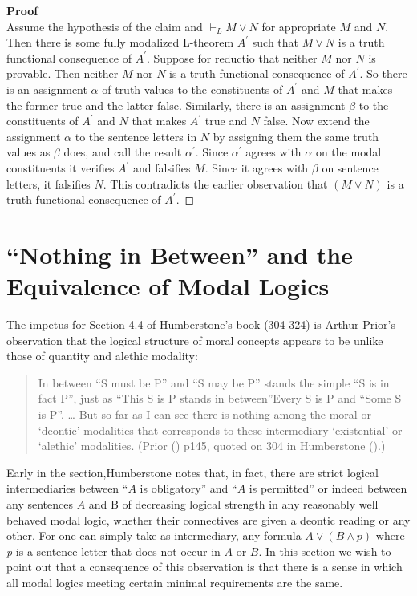 \documentclass[
  11pt,
  letterpaper,
  DIV=11,
  numbers=noendperiod,
  twoside]{scrartcl}
\begin{document}
\textbf{Proof}\\
Assume the hypothesis of the claim and \(\vdash_LM\vee N\) for
appropriate \(M\) and \(N\). Then there is some fully modalized
L-theorem \(A^\prime\) such that \(M\vee N\) is a truth functional
consequence of \(A^\prime\). Suppose for reductio that neither \(M\) nor
\(N\) is provable. Then neither \(M\) nor \(N\) is a truth functional
consequence of \(A^\prime\). So there is an assignment \(\alpha\) of
truth values to the constituents of \(A^\prime\) and \(M\) that makes
the former true and the latter false. Similarly, there is an assignment
\(\beta\) to the constituents of \(A^\prime\) and \(N\) that makes
\(A^\prime\) true and \(N\) false. Now extend the assignment \(\alpha\)
to the sentence letters in \(N\) by assigning them the same truth values
as \(\beta\) does, and call the result \(\alpha^\prime\). Since
\(\alpha^\prime\) agrees with \(\alpha\) on the modal constituents it
verifies \(A^\prime\) and falsifies \(M\). Since it agrees with
\(\beta\) on sentence letters, it falsifies \(N\). This contradicts the
earlier observation that \((M\vee N)\) is a truth functional consequence
of \(A^\prime\).~◻

\section{``Nothing in Between'' and the Equivalence of Modal
Logics}\label{nothing-in-between-and-the-equivalence-of-modal-logics}

The impetus for Section 4.4 of Humberstone's book (304-324) is Arthur
Prior's observation that the logical structure of moral concepts appears
to be unlike those of quantity and alethic modality:

\begin{quote}
In between ``S must be P'' and ``S may be P'' stands the simple ``S is
in fact P'', just as ``This S is P stands in between''Every S is P and
``Some S is P''. \ldots{} But so far as I can see there is nothing among
the moral or `deontic' modalities that corresponds to these intermediary
`existential' or `alethic' modalities. (Prior
() p145, quoted on 304 in
Humberstone ().)
\end{quote}

Early in the section,Humberstone notes that, in fact, there are strict
logical intermediaries between ``\(A\) is obligatory'' and ``\(A\) is
permitted'' or indeed between any sentences \(A\) and B of decreasing
logical strength in any reasonably well behaved modal logic, whether
their connectives are given a deontic reading or any other. For one can
simply take as intermediary, any formula \(A\vee (B\wedge p)\) where
\emph{p} is a sentence letter that does not occur in \(A\) or \(B\). In
this section we wish to point out that a consequence of this observation
is that there is a sense in which all modal logics meeting certain
minimal requirements are the same.
\end{document}
